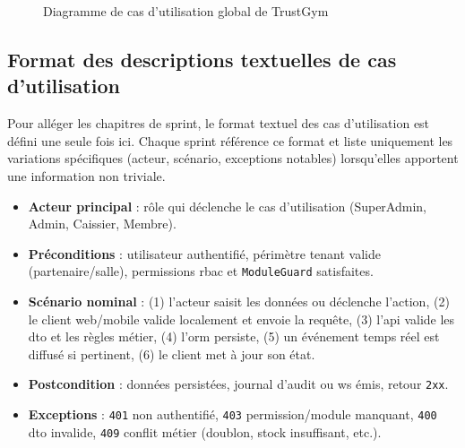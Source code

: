 \documentclass[../main.tex]{subfiles}
\begin{document}
\begin{figure}[H]
{
  }%
  \caption{Diagramme de cas d'utilisation global de TrustGym}
  \label{fig:use_case_global}
\end{figure}

\subsection{Format des descriptions textuelles de cas d'utilisation}
\label{sec:uc_format}
Pour all\'{e}ger les chapitres de sprint, le format textuel des cas d'utilisation est d\'{e}fini une seule fois ici. Chaque sprint r\'{e}f\'{e}rence ce format et liste uniquement les variations sp\'{e}cifiques (acteur, sc\'{e}nario, exceptions notables) lorsqu'elles apportent une information non triviale.

\begin{itemize}
  \item \textbf{Acteur principal} : r\^{o}le qui d\'{e}clenche le cas d'utilisation (SuperAdmin, Admin, Caissier, Membre).
  \item \textbf{Pr\'{e}conditions} : utilisateur authentifi\'{e}, p\'{e}rim\`{e}tre tenant valide (partenaire/salle), permissions \acrshort{rbac} et \texttt{ModuleGuard} satisfaites.
  \item \textbf{Sc\'{e}nario nominal} : (1) l'acteur saisit les donn\'{e}es ou d\'{e}clenche l'action, (2) le client web/mobile valide localement et envoie la requ\^{e}te, (3) l'\acrshort{api} valide les \acrshort{dto} et les r\`{e}gles m\'{e}tier, (4) l'\acrshort{orm} persiste, (5) un \'{e}v\'{e}nement temps r\'{e}el est diffus\'{e} si pertinent, (6) le client met \`{a} jour son \'{e}tat.
  \item \textbf{Postcondition} : donn\'{e}es persist\'{e}es, journal d'audit ou \acrshort{ws} \'{e}mis, retour \texttt{2xx}.
  \item \textbf{Exceptions} : \texttt{401} non authentifi\'{e}, \texttt{403} permission/module manquant, \texttt{400} \acrshort{dto} invalide, \texttt{409} conflit m\'{e}tier (doublon, stock insuffisant, etc.).
\end{itemize}
\end{document}
